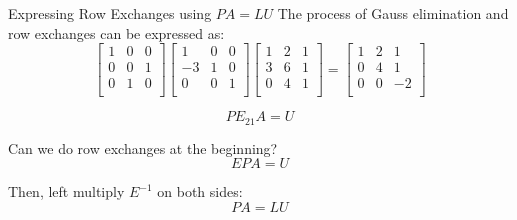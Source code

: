 \documentclass{beamer}
\begin{document}
\begin{frame}{Expressing Row Exchanges using $PA=LU$}
The process of Gauss elimination and row exchanges can be expressed as:
\begin{equation*}
    \left[ \begin{matrix}
        1&		0&		0\\
        0&		0&		1\\
        0&		1&		0\\
    \end{matrix} \right] \left[ \begin{matrix}
        1&		0&		0\\
        -3&		1&		0\\
        0&		0&		1\\
    \end{matrix} \right] \left[ \begin{matrix}
        1&		2&		1\\
        3&		6&		1\\
        0&		4&		1\\
    \end{matrix} \right] =\left[ \begin{matrix}
        1&		2&		1\\
        0&		4&		1\\
        0&		0&		-2\\
    \end{matrix} \right]
\end{equation*}

\begin{equation*}
    PE_{21}A=U
\end{equation*}

Can we do row exchanges at the beginning?
\begin{equation*}
    EPA=U
\end{equation*}

Then, left multiply $E^{-1}$ on both sides:
\begin{equation*}
    PA=LU
\end{equation*}
\end{frame}
\end{document}
